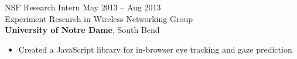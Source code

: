 \documentclass[line,margin]{cv}
\begin{document}
\begin{resume}
NSF Research Intern
\hfill May 2013 -- Aug 2013 \\
Experiment Research in Wireless Networking Group\\\textbf{University of Notre Dame}, South Bend
\begin{itemize}
    \item Created a JavaScript library for in-browser eye tracking and gaze prediction
\end{itemize}


%
%
%

%
%
%

%
%
%

%
%
%


\end{resume}
\end{document}
